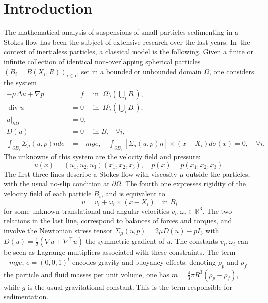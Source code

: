 \documentclass[10pt]{amsart}
\let\ts\textstyle
\renewcommand{\div}{\operatorname{div}}
\theoremstyle{plain}
\theoremstyle{definition}
\let\pa\partial
\let\na\nabla
\newcommand{\R}{\mathbb{R}}
\begin{document}
\section{Introduction}
The mathematical analysis of suspensions of small particles sedimenting in a Stokes flow has been the subject of extensive research over the last years. In~the context of inertialess particles, a classical model is the following. Given a finite or infinite collection of identical non-overlapping spherical particles $(B_i = B(X_i,R))_{i \in I}$, set in a bounded or unbounded domain $\Omega$, one considers the system
\begin{equation} \label{stokes_equation}
\begin{aligned}
-\mu \Delta u + \na p & = f \quad \text{ in } \: \Omega \setminus(\ts\bigcup_i B_i), \\
\div u & = 0 \quad \text{ in } \: \Omega \setminus(\ts\bigcup_i B_i), \\
u\vert_{\pa \Omega} & = 0, \\
D(u) & = 0 \quad \text{ in } B_i \quad \forall i, \\
\int_{\pa B_i} \Sigma_\mu(u,p) n d \sigma & = -m g e, \quad \int_{\pa B_i} [\Sigma_\mu(u,p) n] \times (x-X_i) d \sigma(x) = 0, \quad \forall i.
\end{aligned}
\end{equation}
The unknowns of this system are the velocity field and pressure:
\[
u(x) = (u_1,u_2,u_3)(x_1,x_2,x_3), \quad p(x) = p(x_1,x_2,x_3).
\]
The first three lines describe a Stokes flow with viscosity $\mu$ outside the particles, with the usual no-slip condition at $\pa \Omega$. The fourth one expresses rigidity of the velocity field of each particle $B_i$, and is equivalent to
\[
u = v_i + \omega_i \times (x-X_i) \quad \text{in } B_i
\]
for some unknown translational and angular velocities $v_i, \omega_i \in \R^3$. The two relations in the last line, correspond to balances of forces and torques, and involve the Newtonian stress tensor $\Sigma_\mu(u,p) = 2\mu D(u) - p I_3$ with $D(u)=\frac{1}{2}(\nabla u + \nabla^\top u)$ the symmetric gradient of $u$. The constants $v_i, \omega_i$ can be seen as Lagrange multipliers associated with these constraints. The term $-mge$, $e = (0,0,1)^t$ encodes gravity and buoyancy effects: denoting $\rho_p$ and $\rho_f$ the particle and fluid masses per unit volume, one has $m = \frac{4}{3} \pi R^3 (\rho_p - \rho_f)$, while $g$ is the usual gravitational constant. This is the term responsible for sedimentation.
\end{document}
